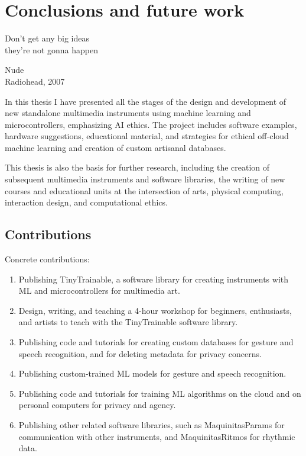 \chapter{Conclusions and future work}

\epigraph{Don't get any big ideas \\ they're not gonna happen}{Nude \\ Radiohead, 2007}

In this thesis I have presented all the stages of the design and development of new standalone multimedia instruments using machine learning and microcontrollers, emphasizing \acrshort{AI} ethics. The project includes software examples, hardware suggestions, educational material, and strategies for ethical off-cloud machine learning and creation of custom artisanal databases.

This thesis is also the basis for further research, including the creation of subsequent multimedia instruments and software libraries, the writing of new courses and educational units at the intersection of arts, physical computing, interaction design, and computational ethics.

\section{Contributions}

Concrete contributions:

\begin{enumerate}
  \item Publishing TinyTrainable, a software library for creating instruments with  \acrshort{ML} and microcontrollers for multimedia art.
  \item Design, writing, and teaching a 4-hour workshop for beginners, enthusiasts, and artists to teach with the TinyTrainable software library.
  \item Publishing code and tutorials for creating custom databases for gesture and speech recognition, and for deleting metadata for privacy concerns.
  \item Publishing custom-trained \acrshort{ML} models for gesture and speech recognition.
  \item Publishing code and tutorials for training \acrshort{ML} algorithms on the cloud and on personal computers for privacy and agency.
  \item Publishing other related software libraries, such as MaquinitasParams for communication with other instruments, and MaquinitasRitmos for rhythmic data.
\end{enumerate}

